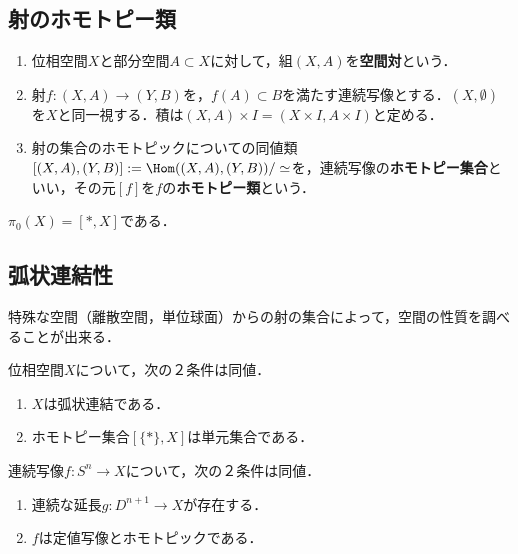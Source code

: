 \documentclass[uplatex, dvipdfmx]{jsreport}
\begin{document}
\subsection{射のホモトピー類}

\begin{definition}\mbox{}
    \begin{enumerate}
        \item 位相空間$X$と部分空間$A\subset X$に対して，組$(X,A)$を\textbf{空間対}という．
        \item 射$f:(X,A)\to(Y,B)$を，$f(A)\subset B$を満たす連続写像とする．$(X,\emptyset)$を$X$と同一視する．積は$(X,A)\times I=(X\times I,A\times I)$と定める．
        \item 射の集合のホモトピックについての同値類$[(X,A),(Y,B)]:=\Hom((X,A),(Y,B))/\simeq$を，連続写像の\textbf{ホモトピー集合}といい，その元$[f]$を$f$の\textbf{ホモトピー類}という．
    \end{enumerate}
\end{definition}

\begin{example}
    $\pi_0(X)=[*,X]$である．
\end{example}

\subsection{弧状連結性}

\begin{tcolorbox}[colframe=ForestGreen, colback=ForestGreen!10!white,breakable,colbacktitle=ForestGreen!40!white,coltitle=black,fonttitle=\bfseries\sffamily,
title=]
    特殊な空間（離散空間，単位球面）からの射の集合によって，空間の性質を調べることが出来る．
\end{tcolorbox}

\begin{lemma}
    位相空間$X$について，次の２条件は同値．
    \begin{enumerate}
        \item $X$は弧状連結である．
        \item ホモトピー集合$[\{*\},X]$は単元集合である．
    \end{enumerate}
\end{lemma}

\begin{lemma}
    連続写像$f:S^n\to X$について，次の２条件は同値．
    \begin{enumerate}
        \item 連続な延長$g:D^{n+1}\to X$が存在する．
        \item $f$は定値写像とホモトピックである．
    \end{enumerate}
\end{lemma}
\end{document}
